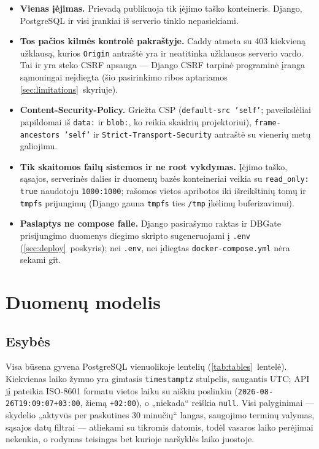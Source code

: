 \documentclass[11pt,a4paper]{article}
\newcommand{\code}[1]{\texttt{#1}}
\begin{document}
\begin{itemize}
  \item \textbf{Vienas įėjimas.} Prievadą publikuoja tik įėjimo taško
        konteineris. Django, PostgreSQL ir visi įrankiai iš
        serverio tinklo nepasiekiami.
  \item \textbf{Tos pačios kilmės kontrolė pakraštyje.} Caddy atmeta
        su 403 kiekvieną užklausą, kurios \code{Origin} antraštė yra
        ir neatitinka užklausos serverio vardo. Tai ir yra steko CSRF
        apsauga — Django CSRF tarpinė programinė įranga sąmoningai
        neįdiegta (šio pasirinkimo ribos aptariamos
        \ref{sec:limitations}~skyriuje).
  \item \textbf{Content-Security-Policy.} Griežta CSP
        (\code{default-src 'self'}; paveikslėliai papildomai iš
        \code{data:} ir \code{blob:}, ko reikia skaidrių
        projektoriui), \code{frame-ancestors 'self'} ir
        \code{Strict-Transport-Security} antraštė su vienerių metų
        galiojimu.
  \item \textbf{Tik skaitomos failų sistemos ir ne root vykdymas.}
        Įėjimo taško, sąsajos, serverinės dalies ir duomenų bazės
        konteineriai veikia su \code{read\_only: true} naudotoju
        \code{1000:1000}; rašomos vietos apribotos iki išreikštinių
        tomų ir \code{tmpfs} prijungimų (Django gauna \code{tmpfs}
        ties \code{/tmp} įkėlimų buferizavimui).
  \item \textbf{Paslaptys ne compose faile.} Django pasirašymo raktas
        ir DBGate prisijungimo duomenys diegimo skripto sugeneruojami
        į \code{.env} (\ref{sec:deploy}~poskyris); nei \code{.env},
        nei įdiegtas \code{docker-compose.yml} nėra sekami git.
\end{itemize}

\section{Duomenų modelis}
\label{sec:datamodel}

\subsection{Esybės}

Visa būsena gyvena PostgreSQL vienuolikoje lentelių
(\ref{tab:tables}~lentelė). Kiekvienas laiko žymuo yra gimtasis
\code{timestamptz} stulpelis, saugantis UTC; API jį pateikia ISO-8601
formatu vietos laiku su aiškiu poslinkiu
(\code{2026-08-26T19:09:07+03:00}, žiemą \code{+02:00}), o „niekada``
reiškia \code{null}. Visi palyginimai — skydelio „aktyvūs per
paskutines 30 minučių`` langas, saugojimo terminų valymas, sąsajos datų
filtrai — atliekami su tikromis datomis, todėl vasaros laiko perėjimai
nekenkia, o rodymas teisingas bet kurioje naršyklės laiko juostoje.
\end{document}
